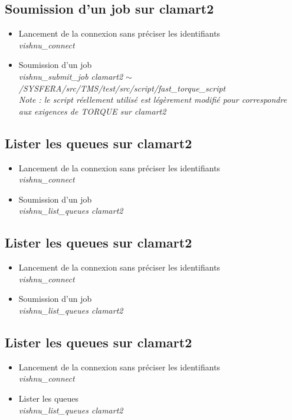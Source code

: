 \documentclass{article}
\begin{document}
\subsection{Soumission d'un job sur clamart2}
\begin{itemize}
\item Lancement de la connexion sans préciser les identifiants\\
  \textit{vishnu\_connect}
\item Soumission d'un job \\
  \textit{vishnu\_submit\_job clamart2 $\sim$/SYSFERA/src/TMS/test/src/script/fast\_torque\_script}\\
  \textit{Note : le script r\'eellement utilis\'e est l\'eg\`erement modifi\'e pour correspondre aux exigences de TORQUE sur clamart2} \\
\end{itemize}

\subsection{Lister les queues sur clamart2}
\begin{itemize}
\item Lancement de la connexion sans préciser les identifiants\\
  \textit{vishnu\_connect}
\item Soumission d'un job\\
  \textit{vishnu\_list\_queues clamart2} \\
\end{itemize}

\subsection{Lister les queues sur clamart2}
\begin{itemize}
\item Lancement de la connexion sans préciser les identifiants\\
  \textit{vishnu\_connect}
\item Soumission d'un job\\
  \textit{vishnu\_list\_queues clamart2} \\
\end{itemize}

\subsection{Lister les queues sur clamart2}
\begin{itemize}
\item Lancement de la connexion sans préciser les identifiants\\
  \textit{vishnu\_connect}
\item Lister les queues\\
  \textit{vishnu\_list\_queues clamart2} \\
\end{itemize}
\end{document}
